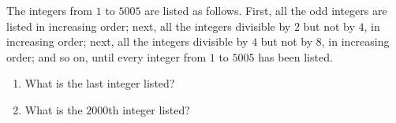 The integers from $1$ to $5005$ are listed as follows. First, all the odd integers are listed in increasing order; next, all the integers divisible by $2$ but not by $4$, in increasing order; next, all the integers divisible by $4$ but not by $8$, in increasing order; and so on, until every integer from $1$ to $5005$ has been listed.
\begin{enumerate}
\item[(a)] What is the last integer listed?
\item[(b)] What is the $2000$th integer listed?
\end{enumerate}
